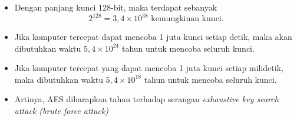 \documentclass{article}
\begin{document}

\begin{itemize}
    \item Dengan panjang kunci 128-bit, maka terdapat sebanyak
    \[ 2^{128} = 3,4 \times 10^{38} \text{ kemungkinan kunci.} \]
    \item Jika komputer tercepat dapat mencoba 1 juta kunci setiap detik, maka akan dibutuhkan waktu $5,4 \times 10^{24}$ tahun untuk mencoba seluruh kunci.
    \item Jika komputer tercepat yang dapat mencoba 1 juta kunci setiap milidetik, maka dibutuhkan waktu $5,4 \times 10^{18}$ tahun untuk mencoba seluruh kunci.
    \item Artinya, AES diharapkan tahan terhadap serangan \textit{exhaustive key search attack (brute force attack)}
\end{itemize}
\end{document}
